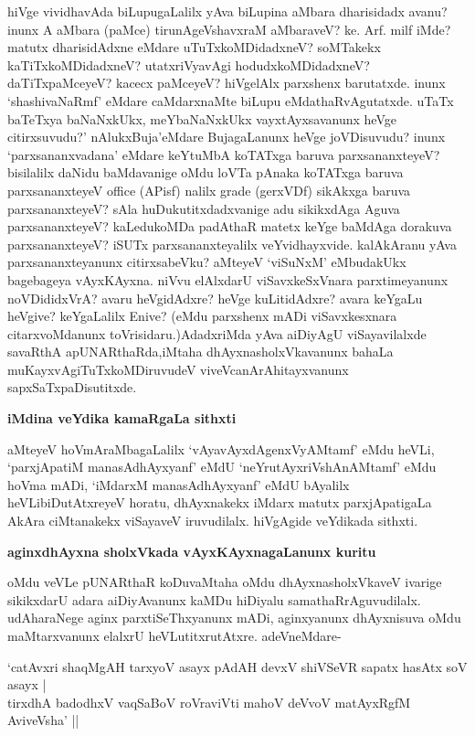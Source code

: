 \noindent
hiVge vividhavAda biLupugaLalilx yAva biLupina aMbara dharisidadx avanu? \hbox{inunx} A aMbara (paMce) tirunAgeVshavxraM aMbaraveV? ke. Arf. milf iMde? matutx dharisidAdxne eMdare uTuTxkoMDidadxneV? soMTakekx kaTiTxkoMDidadxneV? utatxriVya\-vAgi hodudxkoMDidadxneV? daTiTxpaMceyeV? kacecx paMceyeV? hiVgelAlx parxshenx baru\-tatxde. inunx `shashivaNaRmf' eMdare caMdarxnaMte biLupu eMdathaRvAgutatxde. uTaTx baTeTxya baNaNxkUkx, meYbaNaNxkUkx vayxtAyxsavanunx heVge citirxsuvudu?' nAlukxBuja'\break \hbox{eMdare} BujagaLanunx heVge joVDisuvudu? inunx `parxsananxvadana' eMdare keYtuMbA koTATxga baruva parxsananxteyeV? bisilalilx daNidu baMdavanige oMdu loVTa pAnaka koTATxga baruva parxsananxteyeV {\rm office} (APisf) nalilx {\rm grade} (gerxVDf) sikAkxga baruva parxsananxteyeV? sAla huDukutitxdadxvanige adu sikikxdAga Aguva parxsananxteyeV? kaLedu\-koMDa padAthaR matetx keYge baMdAga dorakuva parxsananxteyeV? iSUTx parxsananxteyalilx veYvidhayxvide. kalAkAranu yAva parxsananxteyanunx citirxsabeVku? aMteyeV `viSuNxM' eMbudakUkx bagebageya vAyxKAyxna. niVvu elAlxdarU viSavxkeSxVnara parxtimeyanunx noVDididxVrA? avaru heVgidAdxre? heVge kuLitidAdxre? avara keYgaLu heVgive? keYgaLalilx Enive? (eMdu parxshenx mADi viSavxkesxnara citarxvoMdanunx toVrisidaru.)\break AdadxriMda yAva aiDiyAgU viSayavilalxde savaRthA apUNARthaRda,\break iMtaha dhAyxnasholxVkavanunx bahaLa muKayx\-vAgiTuTxkoMDiruvudeV viveVcanA\-rAhitayx\-vanunx sapxSaTxpaDisutitxde.

{\bigskip
\noindent
{\large\bf iMdina veYdika kamaRgaLa sithxti}}\label{pages208}
\medskip

\noindent
aMteyeV hoVmAraMbagaLalilx `vAyavAyxdAgenxVyAMtamf'\label{208} eMdu heVLi, `parxjApatiM manasA\-dhAyxyanf' eMdU `neYrutAyxriVshAnAMtamf' eMdu hoVma mADi, `iMdarxM manasAdhAyxyanf' eM\-dU bAyalilx heVLibiDutAtxreyeV horatu, dhAyxnakekx iMdarx matutx parxjApatigaLa AkAra ciMtanakekx viSa\-yaveV iruvudilalx. hiVgAgide veYdikada sithxti.

{\bigskip
\noindent
{\large\bf aginxdhAyxna sholxVkada vAyxKAyxnagaLanunx kuritu }}\label{page208}
\medskip

\noindent
oMdu veVLe pUNARthaR koDuvaMtaha oMdu dhAyxnasholxVkaveV ivarige sikikxdarU adara aiDiyA\-vanunx kaMDu hiDiyalu samathaRrAguvudilalx. udAharaNege aginx parxtiSeThxyanunx mADi, aginx\-yanunx dhAyxnisuva oMdu maMtarxvanunx elalxrU heVLutitxrutAtxre. adeVneMdare-

\begin{shloka}
`catAvxri shaqMgAH tarxyoV asayx pAdAH devxV shiVSeVR sapatx hasAtx soV asayx |\\\label{208}
tirxdhA badodhxV vaqSaBoV roVraviVti mahoV deVvoV matAyxRgfM AviveVsha' ||\label{117}
\end{shloka}

